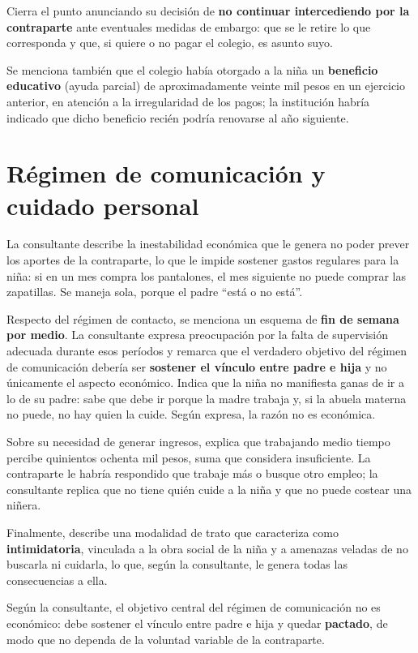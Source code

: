 \documentclass[12pt,oneside]{book}
\begin{document}
Cierra el punto anunciando su decisi\'on de \textbf{no continuar intercediendo por la contraparte} ante eventuales medidas de embargo: que se le retire lo que corresponda y que, si quiere o no pagar el colegio, es asunto suyo.

Se menciona tambi\'en que el colegio hab\'ia otorgado a la ni\~na un \textbf{beneficio educativo} (ayuda parcial) de aproximadamente veinte mil pesos en un ejercicio anterior, en atenci\'on a la irregularidad de los pagos; la instituci\'on habr\'ia indicado que dicho beneficio reci\'en podr\'ia renovarse al a\~no siguiente.

\section{R\'egimen de comunicaci\'on y cuidado personal}

La consultante describe la inestabilidad econ\'omica que le genera no poder prever los aportes de la contraparte, lo que le impide sostener gastos regulares para la ni\~na: si en un mes compra los pantalones, el mes siguiente no puede comprar las zapatillas. Se maneja sola, porque el padre ``est\'a o no est\'a''.

Respecto del r\'egimen de contacto, se menciona un esquema de \textbf{fin de semana por medio}. La consultante expresa preocupaci\'on por la falta de supervisi\'on adecuada durante esos per\'iodos y remarca que el verdadero objetivo del r\'egimen de comunicaci\'on deber\'ia ser \textbf{sostener el v\'inculo entre padre e hija} y no \'unicamente el aspecto econ\'omico. Indica que la ni\~na no manifiesta ganas de ir a lo de su padre: sabe que debe ir porque la madre trabaja y, si la abuela materna no puede, no hay quien la cuide. Seg\'un expresa, la raz\'on no es econ\'omica.

Sobre su necesidad de generar ingresos, explica que trabajando medio tiempo percibe quinientos ochenta mil pesos, suma que considera insuficiente. La contraparte le habr\'ia respondido que trabaje m\'as o busque otro empleo; la consultante replica que no tiene qui\'en cuide a la ni\~na y que no puede costear una ni\~nera.

Finalmente, describe una modalidad de trato que caracteriza como \textbf{intimidatoria}, vinculada a la obra social de la ni\~na y a amenazas veladas de no buscarla ni cuidarla, lo que, seg\'un la consultante, le genera todas las consecuencias a ella.

\begin{important}
Seg\'un la consultante, el objetivo central del r\'egimen de comunicaci\'on no es econ\'omico: debe sostener el v\'inculo entre padre e hija y quedar \textbf{pactado}, de modo que no dependa de la voluntad variable de la contraparte.
\end{important}
\end{document}
